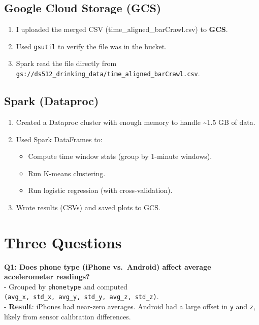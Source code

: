 \documentclass[
  letterpaper,
  DIV=11,
  numbers=noendperiod]{scrartcl}
\providecommand{\tightlist}{%
  \setlength{\itemsep}{0pt}\setlength{\parskip}{0pt}}\usepackage{longtable,booktabs,array}
\begin{document}
\subsection{Google Cloud Storage (GCS)}\label{google-cloud-storage-gcs}

\begin{enumerate}
\def\labelenumi{\arabic{enumi}.}
\tightlist
\item
  I uploaded the merged CSV (time\_aligned\_barCrawl.csv) to
  \textbf{GCS}.
\item
  Used \texttt{gsutil} to verify the file was in the bucket.
\item
  Spark read the file directly from
  \texttt{gs://ds512\_drinking\_data/time\_aligned\_barCrawl.csv}.
\end{enumerate}

\subsection{Spark (Dataproc)}\label{spark-dataproc}

\begin{enumerate}
\def\labelenumi{\arabic{enumi}.}
\tightlist
\item
  Created a Dataproc cluster with enough memory to handle
  \textasciitilde1.5 GB of data.
\item
  Used Spark DataFrames to:

  \begin{itemize}
  \tightlist
  \item
    Compute time window stats (group by 1-minute windows).
  \item
    Run K-means clustering.
  \item
    Run logistic regression (with cross-validation).
  \end{itemize}
\item
  Wrote results (CSVs) and saved plots to GCS.
\end{enumerate}

\section{Three Questions}\label{three-questions}

\textbf{Q1: Does phone type (iPhone vs.~Android) affect average
accelerometer readings?}\\
- Grouped by \texttt{phonetype} and computed
\texttt{(avg\_x,\ std\_x,\ avg\_y,\ std\_y,\ avg\_z,\ std\_z)}.\\
- \textbf{Result}: iPhones had near-zero averages. Android had a large
offset in \texttt{y} and \texttt{z}, likely from sensor calibration
differences.
\end{document}
